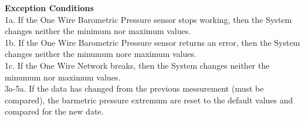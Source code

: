 \documentclass[letterpaper]{article}
\begin{document}
\textbf{Exception Conditions}\\
1a.  If the One Wire Barometric Pressure  sensor stops working, then
the System changes neither the minimum nor maximum values.\\
1b.  If the One Wire Barometric Pressure  sensor returns an error, then
the System changes neither the minumum nore maximum values.\\
1c.  If the One Wire Network breaks, then the System changes neither
the minumum nor maximum values.\\
3a-5a.  If the data has changed from the previous messurement (must be
compared), the barmetric pressure extremum are reset to the default
values and compared for the new date.
\end{document}
